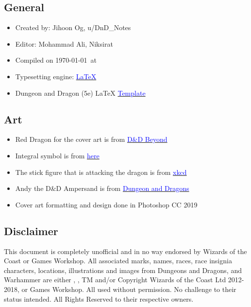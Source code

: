 \documentclass[letterpaper,10pt,twoside,twocolumn,openany]{book}
\begin{document}
\subsection{General}
\begin{itemize}
    \item Created by: Jihoon Og, u/DnD\_Notes
    \item Editor: Mohammad Ali, Niksirat
    \item Compiled on \today\  at \currenttime
    \item Typesetting engine: \href{https://www.latex-project.org/}{\textcolor{blue}{\LaTeX}}
    \item Dungeon and Dragon (5e) LaTeX \href{https://github.com/rpgtex/DND-5e-LaTeX-Template}{\textcolor{blue}{Template}}
\end{itemize}
\subsection{Art}
\begin{itemize}
    \item Red Dragon for the cover art is from \href{https://www.dndbeyond.com/}{\textcolor{blue}{D\&D Beyond}}
    \item Integral symbol is from \href{https://www.kisspng.com/png-integral-symbol-mathematics-calculus-antiderivativ-1116130/preview.html}{\textcolor{blue}{here}}
    \item The stick figure that is attacking the dragon is from \href{https://imgs.xkcd.com/comics/thesis_defense.png}{\textcolor{blue}{xkcd}}
    \item Andy the D\&D Ampersand is from \href{https://www.dnd.wizards.com}{\textcolor{blue}{Dungeon and Dragons}} 
    \item Cover art formatting and design done in Photoshop CC 2019
\end{itemize}

\subsection{Disclaimer}
This document is completely unofficial and in no way endorsed by Wizards of the Coast or Games Workshop. All associated marks, names, races, race insignia characters, locations, illustrations and images from Dungeons and Dragons, and Warhammer are either \textregistered, \textcopyright, TM and/or Copyright Wizards of the Coast Ltd 2012-2018, or Games Workshop. All used without permission. No challenge to their status intended. All Rights Reserved to their respective owners.
\end{document}
